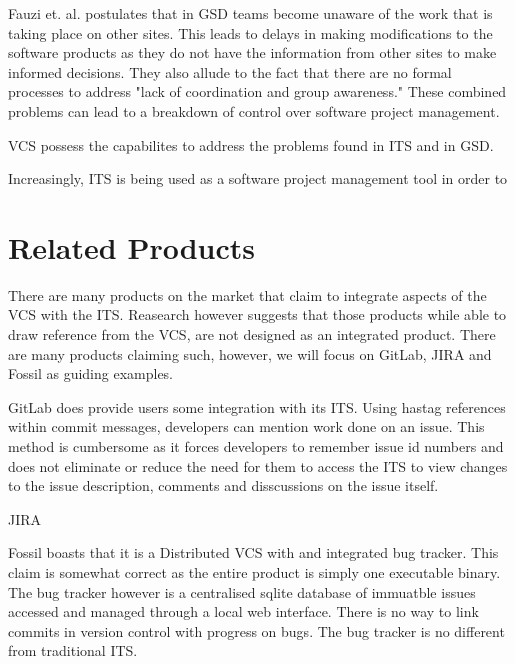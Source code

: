 \documentclass{mproj}
\begin{document}
Fauzi et. al. \cite{Fauzi:2010} postulates that in GSD teams become unaware of the work that is taking place on other sites. This leads to delays in making modifications to the software products as they do not have the information from other sites to make informed decisions. They also allude to the fact that there are no formal processes to address "lack of coordination and group awareness." These combined problems can lead to a breakdown of control over software project management.

VCS possess the capabilites to address the problems found in ITS and in GSD. 





Increasingly, ITS is being used as a software project management tool in order to 







\section{Related Products}

There are many products on the market that claim to integrate aspects of the VCS with the ITS. Reasearch however suggests that those products while able to draw reference from the VCS, are not designed as an integrated product. There are many products claiming such, however, we will focus on GitLab, JIRA and Fossil as guiding examples.

GitLab does provide users some integration with its ITS. Using hastag references within commit messages, developers can mention work done on an issue. This method is cumbersome as it forces developers to remember issue id numbers and does not eliminate or reduce the need for them to access the ITS to view changes to the issue description, comments and disscussions on the issue itself.

JIRA

Fossil boasts that it is a Distributed VCS with and integrated bug tracker. This claim is somewhat correct as the entire product is simply one executable binary. The bug tracker however is a centralised sqlite database of immuatble issues accessed and managed through a local web interface. There is no way to link commits in version control with progress on bugs. The bug tracker is no different from traditional ITS.
\end{document}
